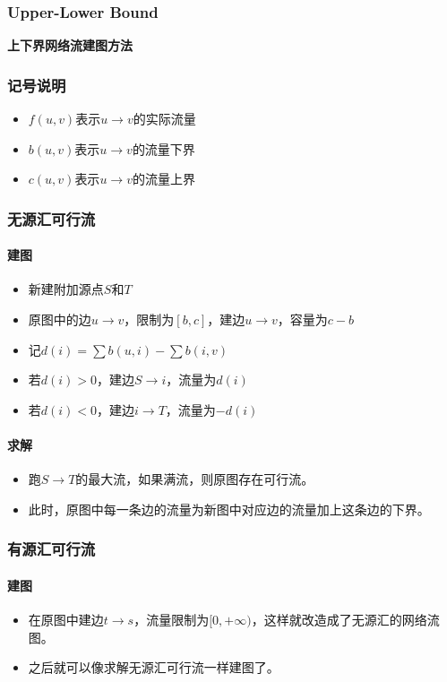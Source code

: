 \documentclass[twoside]{article}
\begin{document}
\subsubsection{Upper-Lower Bound}
\textbf{上下界网络流建图方法}
\subsubsection*{记号说明}
\begin{itemize}
\item $f(u,v)$表示$u \rightarrow v$的实际流量
\item $b(u,v)$表示$u \rightarrow v$的流量下界
\item $c(u,v)$表示$u \rightarrow v$的流量上界
\end{itemize}

\subsubsection*{无源汇可行流}
\paragraph{建图}
\begin{itemize}
\item 新建附加源点$S$和$T$
\item 原图中的边$u \rightarrow v$，限制为$[b,c]$，建边$u \rightarrow v$，容量为$c-b$
\item 记$d(i) = \sum b(u,i) - \sum b(i,v) $
\item 若$d(i)>0$，建边$S \rightarrow i$，流量为$d(i)$
\item 若$d(i)<0$，建边$i \rightarrow T$，流量为$-d(i)$
\end{itemize}

\paragraph{求解}
\begin{itemize}
\item 跑$S \rightarrow T$的最大流，如果满流，则原图存在可行流。
\item 此时，原图中每一条边的流量为新图中对应边的流量加上这条边的下界。
\end{itemize}

\subsubsection*{有源汇可行流}
\paragraph{建图}
\begin{itemize}
\item 在原图中建边$t \rightarrow s$，流量限制为$[0,+\infty)$，这样就改造成了无源汇的网络流图。
\item 之后就可以像求解无源汇可行流一样建图了。
\end{itemize}
\end{document}
